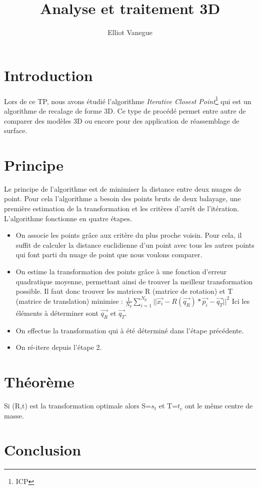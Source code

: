 \documentclass[a4paper,10pt]{article}
\title{Analyse et traitement 3D}
\author{Elliot Vanegue}
\begin{document}
\maketitle

\section{Introduction}
Lors de ce TP, nous avons étudié l'algorithme \textit{Iterative Closest Point}\footnote{ICP} qui est un algorithme de recalage de forme 3D. Ce type de procédé permet entre autre de comparer des modèles 3D ou encore pour des application de réassemblage de surface.

\section{Principe}
Le principe de l'algorithme est de minimiser la distance entre deux nuages de point. Pour cela l'algorithme a besoin des points bruts de deux balayage, une première estimation de la transformation et les critères d'arrêt de l'itération. L'algorithme fonctionne en quatre étapes.
\begin{itemize}
 \item On associe les points grâce aux critère du plus proche voisin. Pour cela, il suffit de calculer la distance euclidienne d'un point avec tous les autres points qui font parti du nuage de point que nous voulons comparer.
 \item On estime la transformation des points grâce à une fonction d'erreur quadratique moyenne, permettant ainsi de trouver la meilleur transformation possible. Il faut donc trouver les matrices R (matrice de rotation) et T (matrice de translation) minimise : 
 $\frac{1}{N_p}\sum_{i=1}^{N_p}||\vec{x_i} - R(\vec{q_R}) * \vec{p_i} - \vec{q_T}||^2$
 Ici les éléments à déterminer sont $\vec{q_R}$ et $\vec{q_T}$.
 \item On effectue la transformation qui à été déterminé dans l'étape précédente.
 \item On ré-itere depuis l'étape 2.
 
\end{itemize}


\section{Théorème}
Si (R,t) est la transformation optimale alors S={$s_t$} et T={$t_c$} ont le même centre de masse.

\section{Conclusion}
\end{document}

